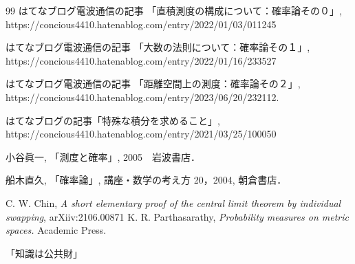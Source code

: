 \documentclass[leqno, 12pt]{jsarticle}
\begin{document}
	
\begin{thebibliography}{99}
はてなブログ電波通信の記事
「直積測度の構成について：確率論その０」, 
https://concious4410.hatenablog.com/entry/2022/01/03/011245

はてなブログ電波通信の記事
「大数の法則について：確率論その１」, 
https://concious4410.hatenablog.com/entry/2022/01/16/233527


はてなブログ電波通信の記事
「距離空間上の測度：確率論その２」, 
https://concious4410.hatenablog.com/entry/2023/06/20/232112.

はてなブログの記事「特殊な積分を求めること」,
https://concious4410.hatenablog.com/entry/2021/03/25/100050




小谷眞一, 「測度と確率」, 2005　岩波書店．

船木直久, 「確率論」, 
講座・数学の考え方 20，2004, 朝倉書店．

C. W. Chin, 
\textit{A short elementary proof of the central limit theorem by individual swapping}, 
arXiiv:2106.00871
K. R. Parthasarathy,  
\textit{Probability measures on metric spaces.} 
Academic Press. 
\end{thebibliography}

「知識は公共財」


			
\end{document}
